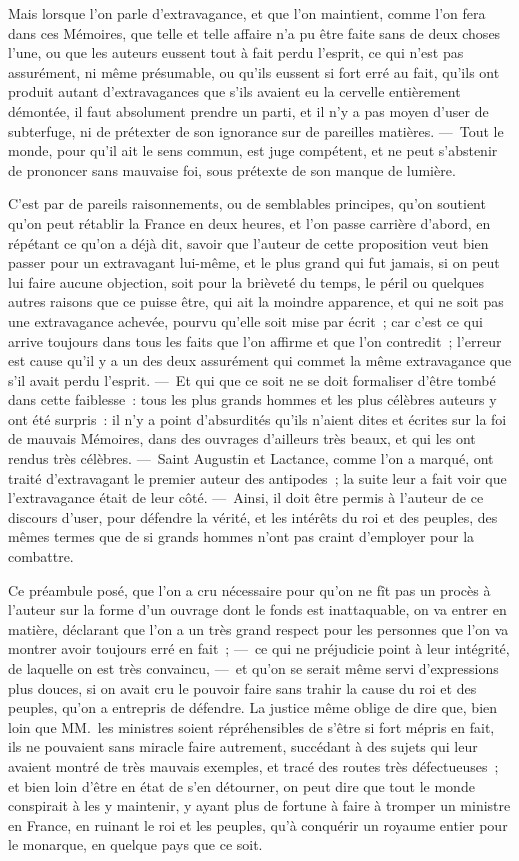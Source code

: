 \documentclass[french,twoside]{book} %
\begin{document}
Mais lorsque l’on parle d’extravagance, et que l’on maintient, comme l’on fera dans ces Mémoires, que telle et telle affaire n’a pu être faite sans de deux choses l’une, ou que les auteurs eussent tout à fait perdu l’esprit, ce qui n’est pas assurément, ni même présumable, ou qu’ils eussent si fort erré au fait, qu’ils ont produit autant d’extravagances que s’ils avaient eu la cervelle entièrement démontée, il faut absolument prendre un parti, et il n’y a pas moyen d’user de subterfuge, ni de prétexter de son ignorance sur de pareilles matières. — Tout le monde, pour qu’il ait le sens commun, est juge compétent, et ne peut s’abstenir de prononcer sans mauvaise foi, sous prétexte de son manque de lumière.\par
C’est par de pareils raisonnements, ou de semblables principes, qu’on soutient qu’on peut rétablir la France en deux heures, et l’on passe carrière d’abord, en répétant ce qu’on a déjà dit, savoir que l’auteur de cette proposition veut bien passer pour un extravagant lui-même, et le plus grand qui fut jamais, si on peut lui faire aucune objection, soit pour la brièveté du temps, le péril ou quelques autres raisons que ce puisse être, qui ait la moindre apparence, et qui ne soit pas une extravagance achevée, pourvu qu’elle soit mise par écrit ; car c’est ce qui arrive toujours dans tous les faits que l’on affirme et que l’on contredit ; l’erreur est cause qu’il y a un des deux assurément qui commet la même extravagance que s’il avait perdu l’esprit. — Et qui que ce soit ne se doit formaliser d’être tombé dans cette faiblesse : tous les plus grands hommes et les plus célèbres auteurs y ont été surpris : il n’y a point d’absurdités qu’ils n’aient dites et écrites sur la foi de mauvais Mémoires, dans des ouvrages d’ailleurs très beaux, et qui les ont rendus très célèbres. — Saint Augustin et Lactance, comme l’on a marqué, ont traité d’extravagant le premier auteur des antipodes ; la suite leur a fait voir que l’extravagance était de leur côté. — Ainsi, il doit être permis à l’auteur de ce discours d’user, pour défendre la vérité, et les intérêts du roi et des peuples, des mêmes termes que de si grands hommes n’ont pas craint d’employer pour la combattre.\par
Ce préambule posé, que l’on a cru nécessaire pour qu’on ne fît pas un procès à l’auteur sur la forme d’un ouvrage dont le fonds est inattaquable, on va entrer en matière, déclarant que l’on a un très grand respect pour les personnes que l’on va montrer avoir toujours erré en fait ; — ce qui ne préjudicie point à leur intégrité, de laquelle on est très convaincu, — et qu’on se serait même servi d’expressions plus douces, si on avait cru le pouvoir faire sans trahir la cause du roi et des peuples, qu’on a entrepris de défendre. La justice même oblige de dire que, bien loin que MM. les ministres soient répréhensibles de s’être si fort mépris en fait, ils ne pouvaient sans miracle faire autrement, succédant à des sujets qui leur avaient montré de très mauvais exemples, et tracé des routes très défectueuses ; et bien loin d’être en état de s’en détourner, on peut dire que tout le monde conspirait à les y maintenir, y ayant plus de fortune à faire à tromper un ministre en France, en ruinant le roi et les peuples, qu’à conquérir un royaume entier pour le monarque, en quelque pays que ce soit.
\end{document}
